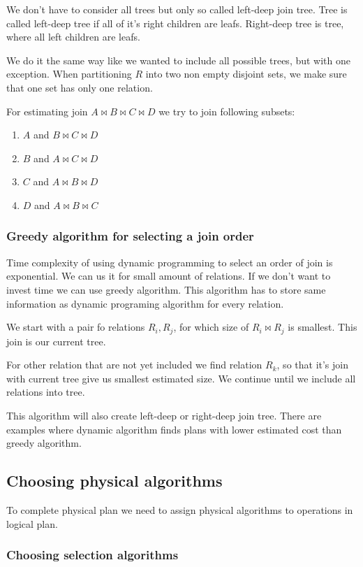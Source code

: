 We don't have to consider all trees but only so called left-deep join tree. Tree is called left-deep tree if all of it's right children are leafs. Right-deep tree is tree, where all left children are leafs.
 
We do it the same way like we wanted to include all possible trees, but with one exception. When partitioning $R$ into two non empty disjoint sets, we make sure that one set has only one relation.

For estimating join $A\Join B\Join C\Join D$ we try to join following subsets:
\begin{enumerate}
\item $A$ and $B\Join C\Join D$
\item $B$ and $A\Join C\Join D$
\item $C$ and $A\Join B\Join D$
\item $D$ and $A\Join B\Join C$
\end{enumerate}

\subsubsection{Greedy algorithm for selecting a join order}
\label{greedyalgorithm}
Time complexity of using dynamic programming to select an order of join is exponential. We can us it for small amount of relations. If we don't want to invest time we can use greedy algorithm. This algorithm has to store same information as dynamic programing algorithm for every relation.

We start with a pair fo relations $R_i, R_j$, for which size of $R_i \Join R_j$ is smallest. This join is our current tree.

For other relation that are not yet included we find relation $R_k$, so that it's join with current tree give us smallest estimated size. We continue until we include all relations into tree. 

This algorithm will also create left-deep or right-deep join tree. There are examples where dynamic algorithm finds plans with lower estimated cost than greedy algorithm.
 
\subsection{Choosing physical algorithms}

To complete physical plan we need to assign physical algorithms to operations in logical plan.
\subsubsection{Choosing selection algorithms}

